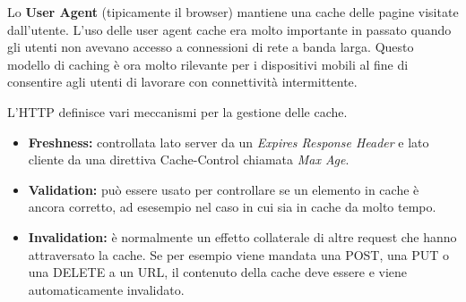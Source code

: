 Lo \textbf{User Agent} (tipicamente il browser) mantiene una cache delle pagine visitate dall’utente. L’uso delle user agent cache era molto importante in passato
quando gli utenti non avevano accesso a connessioni di rete a banda larga. Questo modello di caching è ora molto rilevante per i dispositivi mobili al fine di consentire agli utenti di lavorare
con connettività intermittente.

\vspace{3mm}

L'HTTP definisce vari meccanismi per la gestione delle cache.

\begin{itemize}
    \item 
    \textbf{Freshness:} controllata lato server da un \textit{Expires Response
    Header} e lato cliente da una direttiva Cache-Control chiamata \textit{Max Age}.
    
    \item
    \textbf{Validation:} può essere usato per controllare se un elemento in cache è ancora corretto, ad esesempio nel caso in cui sia in cache da molto tempo.
    
    \item
    \textbf{Invalidation:} è normalmente un effetto collaterale di altre
    request che hanno attraversato la cache. Se per esempio viene mandata una POST, una PUT o una DELETE a un URL, il contenuto della cache deve essere e viene automaticamente invalidato.
\end{itemize}